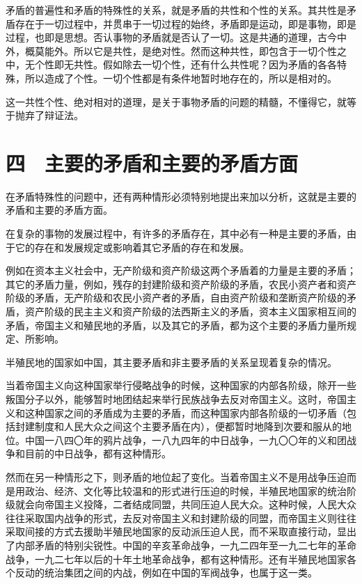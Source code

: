 矛盾的普遍性和矛盾的特殊性的关系，就是矛盾的共性和个性的关系。其共性是矛盾存在于一切过程中，并贯串于一切过程的始终，矛盾即是运动，即是事物，即是过程，也即是思想。否认事物的矛盾就是否认了一切。这是共通的道理，古今中外，概莫能外。所以它是共性，是绝对性。然而这种共性，即包含于一切个性之中，无个性即无共性。假如除去一切个性，还有什么共性呢？因为矛盾的各各特殊，所以造成了个性。一切个性都是有条件地暂时地存在的，所以是相对的。

这一共性个性、绝对相对的道理，是关于事物矛盾的问题的精髓，不懂得它，就等于抛弃了辩证法。

\section{四　主要的矛盾和主要的矛盾方面}

在矛盾特殊性的问题中，还有两种情形必须特别地提出来加以分析，这就是主要的矛盾和主要的矛盾方面。

在复杂的事物的发展过程中，有许多的矛盾存在，其中必有一种是主要的矛盾，由于它的存在和发展规定或影响着其它矛盾的存在和发展。

例如在资本主义社会中，无产阶级和资产阶级这两个矛盾着的力量是主要的矛盾；其它的矛盾力量，例如，残存的封建阶级和资产阶级的矛盾，农民小资产者和资产阶级的矛盾，无产阶级和农民小资产者的矛盾，自由资产阶级和垄断资产阶级的矛盾，资产阶级的民主主义和资产阶级的法西斯主义的矛盾，资本主义国家相互间的矛盾，帝国主义和殖民地的矛盾，以及其它的矛盾，都为这个主要的矛盾力量所规定、所影响。

半殖民地的国家如中国，其主要矛盾和非主要矛盾的关系呈现着复杂的情况。

当着帝国主义向这种国家举行侵略战争的时候，这种国家的内部各阶级，除开一些叛国分子以外，能够暂时地团结起来举行民族战争去反对帝国主义。这时，帝国主义和这种国家之间的矛盾成为主要的矛盾，而这种国家内部各阶级的一切矛盾（包括封建制度和人民大众之间这个主要矛盾在内），便都暂时地降到次要和服从的地位。中国一八四〇年的鸦片战争，一八九四年的中日战争，一九〇〇年的义和团战争和目前的中日战争，都有这种情形。

然而在另一种情形之下，则矛盾的地位起了变化。当着帝国主义不是用战争压迫而是用政治、经济、文化等比较温和的形式进行压迫的时候，半殖民地国家的统治阶级就会向帝国主义投降，二者结成同盟，共同压迫人民大众。这种时候，人民大众往往采取国内战争的形式，去反对帝国主义和封建阶级的同盟，而帝国主义则往往采取间接的方式去援助半殖民地国家的反动派压迫人民，而不采取直接行动，显出了内部矛盾的特别尖锐性。中国的辛亥革命战争，一九二四年至一九二七年的革命战争，一九二七年以后的十年土地革命战争，都有这种情形。还有半殖民地国家各个反动的统治集团之间的内战，例如在中国的军阀战争，也属于这一类。

